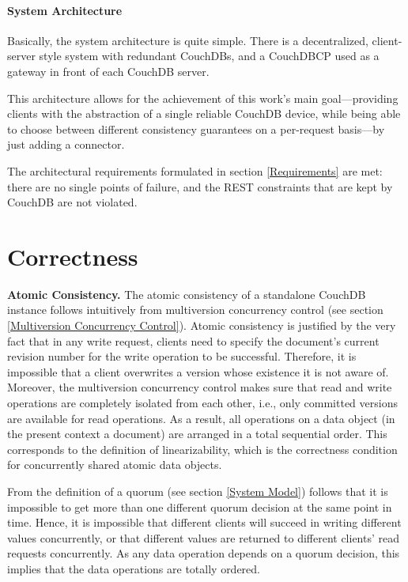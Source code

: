 \paragraph{System Architecture}
Basically, the system architecture is quite simple. There is a decentralized, client-server style system with redundant CouchDBs, and a CouchDBCP used as a gateway in front of each CouchDB server.

This architecture allows for the achievement of this work's main goal---providing clients with the abstraction of a single reliable CouchDB device, while being able to choose between different consistency guarantees on a per-request basis---by just adding a connector.

The architectural requirements formulated in section \ref{Requirements} are met: there are no single points of failure, and the REST constraints that are kept by CouchDB are not violated.


\section{Correctness}
\noindent
{\bf Atomic Consistency.}
The atomic consistency of a standalone CouchDB instance follows intuitively from multiversion concurrency control (see section \ref{Multiversion Concurrency Control}). Atomic consistency is justified by the very fact that in any write request, clients need to specify the document's current revision number for the write operation to be successful. Therefore, it is impossible that a client overwrites a version whose existence it is not aware of. Moreover, the multiversion concurrency control makes sure that read and write operations are completely isolated from each other, i.e., only committed versions are available for read operations. As a result, all operations on a data object (in the present context a document) are arranged in a total sequential order. This corresponds to the definition of linearizability, which is the correctness condition for concurrently shared atomic data objects.

From the definition of a quorum (see section \ref{System Model}) follows that it is impossible to get more than one different quorum decision at the same point in time. Hence, it is impossible that different clients will succeed in writing different values concurrently, or that different values are returned to different clients' read requests concurrently. As any data operation depends on a quorum decision, this implies that the data operations are totally ordered.

